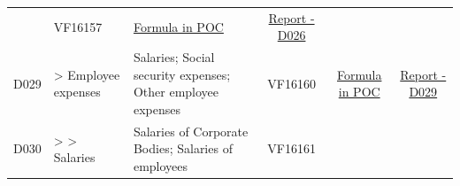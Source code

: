 \documentclass[]{book}
\begin{document}
\begin{longtable}[]{@{}cllccc@{}}
\begin{minipage}[t]{0.16\columnwidth}
\strut
\end{minipage} & \begin{minipage}[t]{0.09\columnwidth}\centering
VF16157\strut
\end{minipage} & \begin{minipage}[t]{0.15\columnwidth}\centering
\protect\hyperlink{d026---formula-in-poc}{Formula in POC}\strut
\end{minipage} & \begin{minipage}[t]{0.16\columnwidth}\centering
\href{./Auxiliary\%20Files/technical_reports/variable_report/D026(!).pdf}{Report - D026}\strut
\end{minipage}\tabularnewline
\begin{minipage}[t]{0.08\columnwidth}\centering
D029\strut
\end{minipage} & \begin{minipage}[t]{0.20\columnwidth}\raggedright
\textgreater{} Employee expenses\strut
\end{minipage} & \begin{minipage}[t]{0.16\columnwidth}\raggedright
Salaries; Social security expenses; Other employee expenses\strut
\end{minipage} & \begin{minipage}[t]{0.09\columnwidth}\centering
VF16160\strut
\end{minipage} & \begin{minipage}[t]{0.15\columnwidth}\centering
\protect\hyperlink{d029---formula-in-poc}{Formula in POC}\strut
\end{minipage} & \begin{minipage}[t]{0.16\columnwidth}\centering
\href{./Auxiliary\%20Files/technical_reports/variable_report/D029(!).pdf}{Report - D029}\strut
\end{minipage}\tabularnewline
\begin{minipage}[t]{0.08\columnwidth}\centering
D030\strut
\end{minipage} & \begin{minipage}[t]{0.20\columnwidth}\raggedright
\textgreater{} \textgreater{} Salaries\strut
\end{minipage} & \begin{minipage}[t]{0.16\columnwidth}\raggedright
Salaries of Corporate Bodies; Salaries of employees\strut
\end{minipage} & \begin{minipage}[t]{0.09\columnwidth}\centering
VF16161\strut
\end{minipage} & \begin{minipage}[t]{0.15\columnwidth}\centering

\end{minipage}
\end{longtable}
\end{document}
